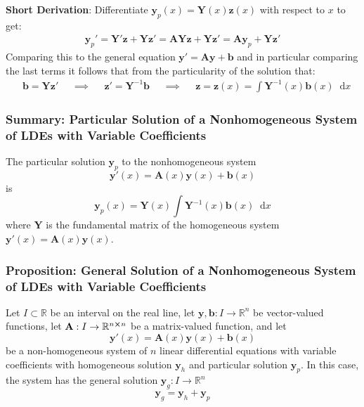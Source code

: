\documentclass[11pt, a4paper]{article}
\newcommand{\diff}{\mathop{}\!\mathrm{d}} %
\newcommand{\R}{\mathbb{R}} %
\begin{document}
\textbf{Short Derivation}:
Differentiate $ \bm{y}_p(x) = \mathbf{Y}(x) \bm{z}(x) $ with respect to $ x $ to get:
\begin{align*}
	\bm{y}_p' = \mathbf{Y}' \bm{z} + \mathbf{Y} \bm{z}' = \mathbf{A} \mathbf{Y} \bm{z} + \mathbf{Y} \bm{z}' = \mathbf{A} \bm{y}_p + \mathbf{Y} \bm{z}'
\end{align*}
Comparing this to the general equation $ \bm{y}' = \mathbf{A} \bm{y} + \bm{b} $ and in particular comparing the last terms it follows that from the particularity of the solution that:
\begin{align*}
	& \bm{b} = \mathbf{Y} \bm{z}' && \implies && \bm{z}' = \mathbf{Y}^{-1} \bm{b} && \implies && 	\bm{z} = \bm{z}(x) = \int \mathbf{Y}^{-1}(x) \bm{b}(x) \diff x
\end{align*}

\subsubsection{Summary: Particular Solution of a Nonhomogeneous System of LDEs with Variable Coefficients}
The particular solution $ \bm{y}_p $ to the nonhomogeneous system 
\begin{equation*}
	\bm{y}'(x) = \mathbf{A}(x) \bm{y}(x) + \bm{b}(x) 
\end{equation*}
is
\begin{equation*}
	\bm{y}_p(x) = \mathbf{Y}(x) \int \mathbf{Y}^{-1}(x) \bm{b}(x) \diff x
\end{equation*}
where $ \mathbf{Y} $ is the fundamental matrix of the homogeneous system $ \bm{y}'(x) = \mathbf{A}(x) \bm{y}(x) $.

\subsubsection{Proposition: General Solution of a Nonhomogeneous System of LDEs with Variable Coefficients}
Let $ I \subset \R $ be an interval on the real line, let $ \bm{y}, \bm{b}: I \to \R^n $ be vector-valued functions, let $ \mathbf{A} : I \to \R^{n \cross n} $ be a matrix-valued function, and let
\begin{equation*}
	\bm{y}'(x) = \mathbf{A}(x) \bm{y}(x) + \bm{b}(x)
\end{equation*}
be a non-homogeneous system of $ n $ linear differential equations with variable coefficients with homogeneous solution $ \bm{y}_h $ and particular solution $ \bm{y}_p $. In this case, the system has the general solution $ \bm{y}_g : I \to \R^n $
\begin{equation*}
	\bm{y}_g = \bm{y}_h + \bm{y}_p
\end{equation*}
\end{document}
